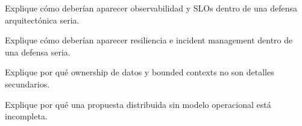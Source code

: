 \documentclass[variant=guia,cover=institutional,mode=screen]{ua-engineering-v6-article}
\begin{document}
\begin{uaexercise}
Explique cómo deberían aparecer observabilidad y SLOs dentro de una defensa arquitectónica seria.
\end{uaexercise}

\begin{uaexercise}
Explique cómo deberían aparecer resiliencia e incident management dentro de una defensa seria.
\end{uaexercise}

\begin{uaexercise}
Explique por qué ownership de datos y bounded contexts no son detalles secundarios.
\end{uaexercise}

\begin{uaexercise}
Explique por qué una propuesta distribuida sin modelo operacional está incompleta.
\end{uaexercise}
\end{document}
